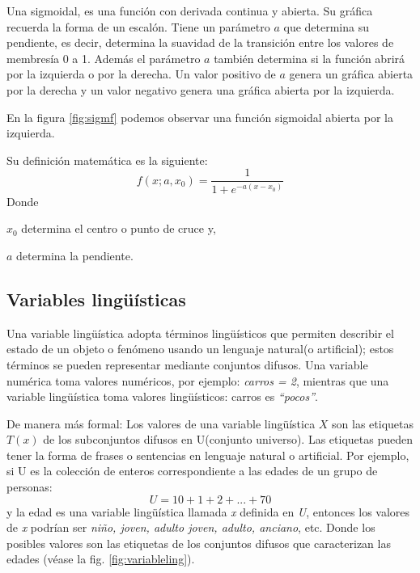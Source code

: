 Una sigmoidal, es una función con derivada continua y abierta. Su gráfica recuerda la forma de un escalón. Tiene un parámetro $a$ que determina su pendiente, es decir, determina la suavidad de la transición entre los valores de membresía 0 a 1. Además el parámetro $a$ también determina si la función abrirá por la izquierda o por la derecha. Un valor positivo de $a$ genera un gráfica abierta por la derecha
y un valor negativo genera una gráfica abierta por la izquierda.

En la figura \ref{fig:sigmf} podemos observar una función sigmoidal abierta por la izquierda.

Su definición matemática es la siguiente:
\begin{displaymath}
	f(x;a,x_0) = \frac{1}{1+e^{-a(x-x_0)}}
\end{displaymath}
Donde
{\setlength{\baselineskip}{0.7\baselineskip}\begin{description}
	\item $x_0$ determina el centro o punto de cruce y,
	\item $a$ determina la pendiente.
\end{description}}

\subsection{Variables lingüísticas}
Una variable lingüística adopta términos lingüísticos que permiten describir el estado de un objeto o fenómeno usando un lenguaje natural(o artificial); estos términos se pueden representar mediante conjuntos difusos. Una variable numérica toma valores numéricos, por ejemplo: \textit{carros = 2}, mientras que una variable lingüística toma valores lingüísticos: carros es \textit{``pocos''}.

De manera más formal: Los valores de una variable lingüística $X$ son las etiquetas $T(x)$ de los subconjuntos difusos en U(conjunto universo). Las etiquetas pueden tener la forma de frases o sentencias en lenguaje natural o artificial. Por ejemplo, si U es la colección de enteros correspondiente a las edades de un grupo de personas:
$$U = 10 + 1 + 2 + ... + 70$$
y la edad es una variable lingüística llamada \textit{x} definida en \textit{U}, entonces los valores de \textit{x} podrían ser \textit{niño, joven, adulto joven, adulto, anciano}, etc. Donde los posibles valores son las etiquetas de los conjuntos difusos que caracterizan las edades (véase la fig. \ref{fig:variableling}).

